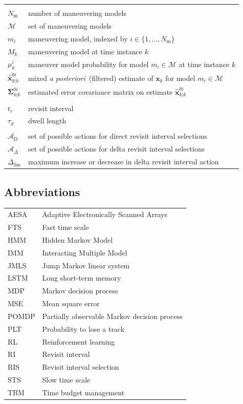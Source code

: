 \documentclass[english, 12pt, a4paper, elec, utf8, a-1b, online]{aaltothesis}
\renewcommand{\vec}[1]{\mathbf{#1}}
\newcommand{\As}{\mathcal{A}}
\newcommand{\x}{\vec{x}_k}
\newcommand{\modeprob}{\mu_k^i}
\newcommand{\xmxinitcurr}{\hat{\vec{x}}^{0i}_{k|k}}
\newcommand{\ecovmxinitcurr}{\bm{\Sigma}^{0i}_{k|k}}
\newcommand{\deltalim}{\Delta_\text{lim}}
\newcommand{\Asdir}{\As_\text{D}}
\newcommand{\Asdelta}{\As_\Delta}
\def\post{\textit{a posteriori}\ }
\newcommand{\mimm}{\mathcal{M}}
\newcommand{\nmodels}{{N_\text{m}}}
\newcommand{\ri}{t_r}
\begin{document}
\begin{longtable}{ll}
&\\
$\nmodels$ & number of maneuvering models \\
$\mimm$ & set of maneuvering models \\
$m_i$ & maneuvering model, indexed by $i \in \{1, ..., \nmodels\}$ \\
$M_k$ & maneuvering model at time instance $k$ \\
$\modeprob$ & maneuver model probability for model $m_i \in \mimm$ at time instance $k$ \\
$\xmxinitcurr$ & mixed \post (filtered) estimate of $\x$ for model $m_i \in \mimm$\\
$\ecovmxinitcurr$ & estimated error covariance matrix on estimate $\xmxinitcurr$\\
&\\
$\ri$ & revisit interval \\
$\tau_d$ & dwell length \\
&\\
$\Asdir$ & set of possible actions for direct revisit interval selections \\
$\Asdelta$ & set of possible actions for delta revisit interval selections \\
$\deltalim$ & maximum increase or decrease in delta revisit interval action \\
\end{longtable}

\subsection*{Abbreviations}

\begin{tabular}{ll}
AESA & Adaptive Electronically Scanned Arrays \\
FTS & Fast time scale \\
HMM & Hidden Markov Model \\
IMM & Interacting Multiple Model \\
JMLS & Jump Markov linear system \\
LSTM & Long short-term memory \\
MDP & Markov decision process \\
MSE & Mean square error \\
POMDP      & Partially observable Markov decision process \\
PLT & Probability to lose a track \\
RL & Reinforcement learning \\
RI  & Revisit interval \\
RIS & Revisit interval selection \\
STS & Slow time scale \\
TBM & Time budget management \\
\end{tabular}
\end{document}
